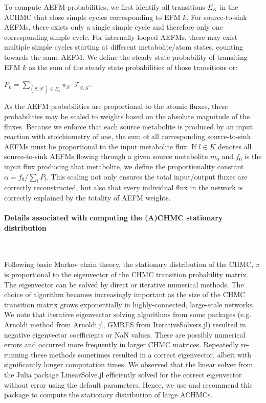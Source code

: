 \documentclass[12pt]{article}
\begin{document}
To compute AEFM probabilities, we first identify all transitions $E_K$ in
the ACHMC that close simple cycles corresponding to EFM $k$. For
source-to-sink AEFMs, there exists only a single simple cycle and
therefore only one corresponding simple cycle. For internally looped
AEFMs, there may exist multiple simple cycles starting at different
metabolite/atom states, counting towards the same AEFM. We define the
steady state probability of transiting EFM $k$  as the sum of the steady
state probabilities of those transitions or:

$P_k = \sum_{(S,S^{\prime}) \in E_k} \pi_S \cdot
\mathcal{T}_{S,S^{\prime}}$.

\noindent As the AEFM probabilities are proportional to the atomic fluxes,
these probabilities may be scaled to weights based on the absolute
magnitude of the fluxes. Because we enforce that each source metabolite is
produced by an input reaction with stoichiometry of one, the sum of all
corresponding source-to-sink AEFMs must be proportional to the input
metabolite flux. If $l \in K$ denotes all source-to-sink AEFMs
flowing through a given source metabolite $m_0$ and $f_0$ is the input
flux producing that metabolite, we define the proportionality constant
$\alpha = f_0 / \sum_l P_l$. This scaling not only ensures the total
input/output fluxes are correctly reconstructed, but also that every
individual flux in the network is correctly explained by the totality of
AEFM weights.

\paragraph*{Details associated with computing the (A)CHMC stationary distribution}

\hspace*{0.1cm}\\\noindent

Following basic Markov chain theory, the stationary distribution of the
CHMC, $\pi$ is proportional to the eigenvector of the CHMC transition
probability matrix. The eigenvector can be solved by direct or iterative
numerical methods. The choice of algorithm becomes increasingly important
as the size of the CHMC transition matrix grows exponentially in
highly-connected, large-scale networks. We note that iterative eigenvector
solving algorithms from some packages (e.g. Arnoldi method from
Arnoldi.jl, GMRES from IterativeSolvers.jl) resulted in negative
eigenvector coefficients or NaN values. These are possibly numerical
errors and occurred more frequently in larger CHMC matrices. Repeatedly
re-running these methods sometimes resulted in a correct eigenvector,
albeit with significantly longer computation times. We observed that the
linear solver from the Julia package LinearSolve.jl efficiently solved for
the correct eigenvector without error using the default parameters. Hence,
we use and recommend this package to compute the stationary distribution
of large ACHMCs.
\end{document}
